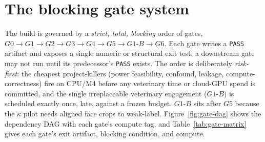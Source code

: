 \section{The blocking gate system}
\label{sec:gates}

The build is governed by a \emph{strict, total, blocking} order of gates,
$G0 \to G1 \to G2 \to G3 \to G4 \to G5 \to G1\text{-}B \to G6$. Each gate writes a
\texttt{PASS} artifact and exposes a single numeric or structural exit test; a downstream gate
may not run until its predecessor's \texttt{PASS} exists. The order is deliberately
\emph{risk-first}: the cheapest project-killers (power feasibility, confound, leakage,
compute-correctness) fire on CPU/M4 before any veterinary time or cloud-GPU spend is committed,
and the single irreplaceable veterinary engagement ($G1\text{-}B$) is scheduled exactly once,
late, against a frozen budget. $G1\text{-}B$ sits after $G5$ because the $\kappa$ pilot needs
aligned face crops to weak-label. Figure~\ref{fig:gate-dag} shows the dependency DAG with each
gate's compute tag, and Table~\ref{tab:gate-matrix} gives each gate's exit artifact, blocking
condition, and compute.

